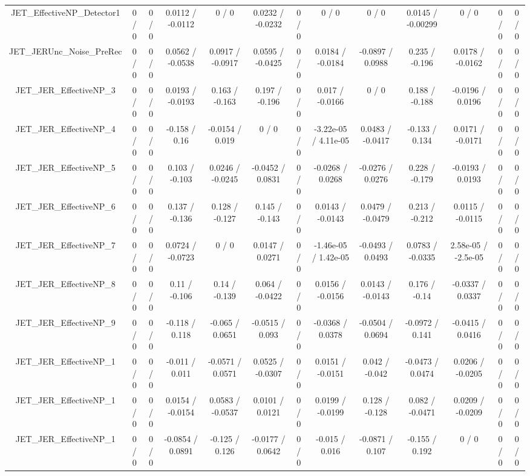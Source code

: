 \documentclass[10pt]{article}
\begin{document}
\begin{table}[htbp]
\begin{center}
\begin{tabular}{|c|c|c|c|c|c|c|c|c|c|c|c|c|}
  JET_EffectiveNP_Detector1 & 0 / 0 & 0 / 0 & 0.0112 / -0.0112 & 0 / 0 & 0.0232 / -0.0232 & 0 / 0 & 0 / 0 & 0 / 0 & 0.0145 / -0.00299 & 0 / 0 & 0 / 0 & 0 / 0 \\ 
  JET_JERUnc_Noise_PreRec & 0 / 0 & 0 / 0 & 0.0562 / -0.0538 & 0.0917 / -0.0917 & 0.0595 / -0.0425 & 0 / 0 & 0.0184 / -0.0184 & -0.0897 / 0.0988 & 0.235 / -0.196 & 0.0178 / -0.0162 & 0 / 0 & 0 / 0 \\ 
  JET_JER_EffectiveNP_3 & 0 / 0 & 0 / 0 & 0.0193 / -0.0193 & 0.163 / -0.163 & 0.197 / -0.196 & 0 / 0 & 0.017 / -0.0166 & 0 / 0 & 0.188 / -0.188 & -0.0196 / 0.0196 & 0 / 0 & 0 / 0 \\ 
  JET_JER_EffectiveNP_4 & 0 / 0 & 0 / 0 & -0.158 / 0.16 & -0.0154 / 0.019 & 0 / 0 & 0 / 0 & -3.22e-05 / 4.11e-05 & 0.0483 / -0.0417 & -0.133 / 0.134 & 0.0171 / -0.0171 & 0 / 0 & 0 / 0 \\ 
  JET_JER_EffectiveNP_5 & 0 / 0 & 0 / 0 & 0.103 / -0.103 & 0.0246 / -0.0245 & -0.0452 / 0.0831 & 0 / 0 & -0.0268 / 0.0268 & -0.0276 / 0.0276 & 0.228 / -0.179 & -0.0193 / 0.0193 & 0 / 0 & 0 / 0 \\ 
  JET_JER_EffectiveNP_6 & 0 / 0 & 0 / 0 & 0.137 / -0.136 & 0.128 / -0.127 & 0.145 / -0.143 & 0 / 0 & 0.0143 / -0.0143 & 0.0479 / -0.0479 & 0.213 / -0.212 & 0.0115 / -0.0115 & 0 / 0 & 0 / 0 \\ 
  JET_JER_EffectiveNP_7 & 0 / 0 & 0 / 0 & 0.0724 / -0.0723 & 0 / 0 & 0.0147 / 0.0271 & 0 / 0 & -1.46e-05 / 1.42e-05 & -0.0493 / 0.0493 & 0.0783 / -0.0335 & 2.58e-05 / -2.5e-05 & 0 / 0 & 0 / 0 \\ 
  JET_JER_EffectiveNP_8 & 0 / 0 & 0 / 0 & 0.11 / -0.106 & 0.14 / -0.139 & 0.064 / -0.0422 & 0 / 0 & 0.0156 / -0.0156 & 0.0143 / -0.0143 & 0.176 / -0.14 & -0.0337 / 0.0337 & 0 / 0 & 0 / 0 \\ 
  JET_JER_EffectiveNP_9 & 0 / 0 & 0 / 0 & -0.118 / 0.118 & -0.065 / 0.0651 & -0.0515 / 0.093 & 0 / 0 & -0.0368 / 0.0378 & -0.0504 / 0.0694 & -0.0972 / 0.141 & -0.0415 / 0.0416 & 0 / 0 & 0 / 0 \\ 
  JET_JER_EffectiveNP_1 & 0 / 0 & 0 / 0 & -0.011 / 0.011 & -0.0571 / 0.0571 & 0.0525 / -0.0307 & 0 / 0 & 0.0151 / -0.0151 & 0.042 / -0.042 & -0.0473 / 0.0474 & 0.0206 / -0.0205 & 0 / 0 & 0 / 0 \\ 
  JET_JER_EffectiveNP_1 & 0 / 0 & 0 / 0 & 0.0154 / -0.0154 & 0.0583 / -0.0537 & 0.0101 / 0.0121 & 0 / 0 & 0.0199 / -0.0199 & 0.128 / -0.128 & 0.082 / -0.0471 & 0.0209 / -0.0209 & 0 / 0 & 0 / 0 \\ 
  JET_JER_EffectiveNP_1 & 0 / 0 & 0 / 0 & -0.0854 / 0.0891 & -0.125 / 0.126 & -0.0177 / 0.0642 & 0 / 0 & -0.015 / 0.016 & -0.0871 / 0.107 & -0.155 / 0.192 & 0 / 0 & 0 / 0 & 0 / 0 \\ 

\end{tabular}
\end{center}
\end{table}
\end{document}
